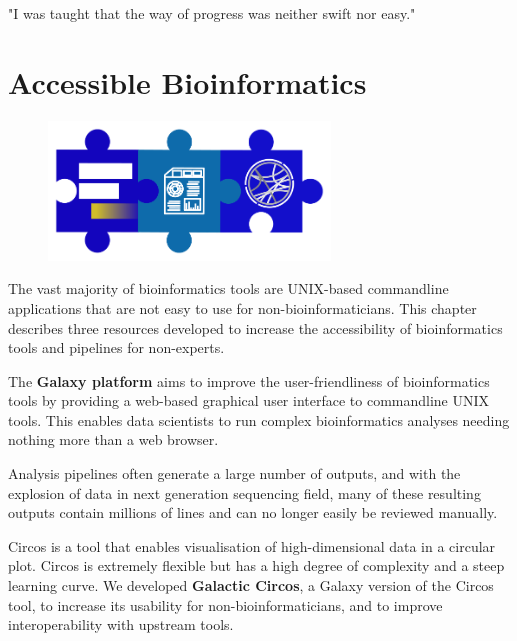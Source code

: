 \begin{savequote}[75mm]
"I was taught that the way of progress was neither swift nor easy."
\end{savequote}

\chapter{Accessible Bioinformatics}\label{chapter:general}
\setcounter{figure}{-1}
\setcounter{table}{-1}
\setcounter{section}{-1}
\setcounter{NAT@ctr}{-1}

\begin{figure}[t!]
\includegraphics[height=10em]{frontmatter/images/chapter-header-technical.png}
\end{figure}
\setcounter{figure}{-1}
\setcounter{table}{-1}
\setcounter{section}{-1}

The vast majority of bioinformatics tools are UNIX-based commandline applications that are not easy to use for non-bioinformaticians. This chapter describes three resources developed to increase the accessibility of bioinformatics tools and pipelines for non-experts.

The \textbf{Galaxy platform} aims to improve the user-friendliness of bioinformatics tools by providing a web-based graphical user interface to commandline UNIX tools. This enables data scientists to run complex bioinformatics analyses needing nothing more than a web browser.

Analysis pipelines often generate a large number of outputs, and with the explosion of data in next generation sequencing field, many of these resulting outputs contain millions of lines and can no longer easily be reviewed manually.

Circos is a tool that enables visualisation of high-dimensional data in a circular plot. Circos is extremely flexible but has a high degree of complexity and a steep learning curve. We developed \textbf{Galactic Circos}, a Galaxy version of the Circos tool, to increase its usability for non-bioinformaticians, and to improve interoperability with upstream tools.

